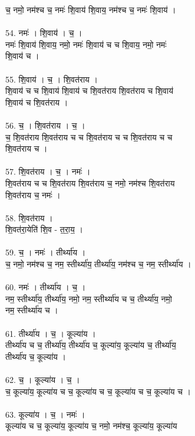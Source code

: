 च॒ नमो॒ नम॑श्च च॒ नमः॑ शि॒वाय॑ शि॒वाय॒ नम॑श्च च॒ नमः॑ शि॒वाय॑ ।\\
\\
54. नमः॑ । शि॒वाय॑ । च॒ ।\\
नमः॑ शि॒वाय॑ शि॒वाय॒ नमो॒ नमः॑ शि॒वाय॑ च च शि॒वाय॒ नमो॒ नमः॑\\
शि॒वाय॑ च ।\\
\\
55. शि॒वाय॑ । च॒ । शि॒वत॑राय ।\\
शि॒वाय॑ च च शि॒वाय॑ शि॒वाय॑ च शि॒वत॑राय शि॒वत॑राय च शि॒वाय॑\\
शि॒वाय॑ च शि॒वत॑राय ।\\
\\
56. च॒ । शि॒वत॑राय । च॒ ।\\
च॒ शि॒वत॑राय शि॒वत॑राय च च शि॒वत॑राय च च शि॒वत॑राय च च\\
शि॒वत॑राय च ।\\
\\
57. शि॒वत॑राय । च॒ । नमः॑ ।\\
शि॒वत॑राय च च शि॒वत॑राय शि॒वत॑राय च॒ नमो॒ नम॑श्च शि॒वत॑राय\\
शि॒वत॑राय च॒ नमः॑ ।\\
\\
58. शि॒वत॑राय ।\\
शि॒वत॑रा॒येति॑ शि॒व - त॒रा॒य॒ ।\\
\\
59. च॒ । नमः॑ । तीर्थ्या॑य ।\\
च॒ नमो॒ नम॑श्च च॒ नम॒ स्तीर्थ्या॑य॒ तीर्थ्या॑य॒ नम॑श्च च॒ नम॒ स्तीर्थ्या॑य ।\\
\\
60. नमः॑ । तीर्थ्या॑य । च॒ ।\\
नम॒ स्तीर्थ्या॑य॒ तीर्थ्या॑य॒ नमो॒ नम॒ स्तीर्थ्या॑य च च॒ तीर्थ्या॑य॒ नमो॒\\
नम॒ स्तीर्थ्या॑य च ।\\
\\
61. तीर्थ्या॑य । च॒ । कूल्या॑य ।\\
तीर्थ्या॑य च च॒ तीर्थ्या॑य॒ तीर्थ्या॑य च॒ कूल्या॑य॒ कूल्या॑य च॒ तीर्थ्या॑य॒\\
तीर्थ्या॑य च॒ कूल्या॑य ।\\
\\
62. च॒ । कूल्या॑य । च॒ ।\\
च॒ कूल्या॑य॒ कूल्या॑य च च॒ कूल्या॑य च च॒ कूल्या॑य च च॒ कूल्या॑य च ।\\
\\
63. कूल्या॑य । च॒ । नमः॑ ।\\
कूल्या॑य च च॒ कूल्या॑य॒ कूल्या॑य च॒ नमो॒ नम॑श्च॒ कूल्या॑य॒ कूल्या॑य\\
